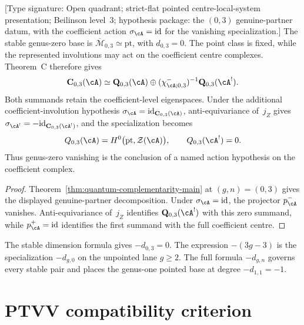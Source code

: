 \begin{proposition}
\label{prop:theorem-C-stable-genus-zero}
\textup{[Type signature: Open quadrant; strict-flat pointed
centre-local-system presentation; Beilinson level~\(3\); hypothesis
package: the \((0,3)\) genuine-partner datum, with the coefficient
action \(\sigma_\cA=\mathrm{id}\) for the vanishing specialization.]}
The stable genus-zero base is
\(\overline{\mathcal M}_{0,3}\simeq\mathrm{pt}\), with
\(d_{0,3}=0\).  The point class is fixed, while the represented
involutions may act on the coefficient centre complexes.  Theorem~C
therefore gives
\[
 \mathbf C_{0,3}(\cA)\simeq
 \mathbf Q_{0,3}(\cA)\oplus
 (\chi^-_{\cA;0,3})^{-1}\mathbf Q_{0,3}(\cA^!).
\]
Both summands retain the coefficient-level eigenspaces.  Under the
additional coefficient-involution hypothesis
\(\sigma_{\cA}=\mathrm{id}_{\mathbf C_{0,3}(\cA)}\),
anti-equivariance of~\(j_Z\) gives
\(\sigma_{\cA^!}=-\mathrm{id}_{\mathbf C_{0,3}(\cA^!)}\), and the
specialization becomes
\[
 Q_{0,3}(\cA)=H^0\bigl(\mathrm{pt},\mathcal Z(\cA)\bigr),
 \qquad Q_{0,3}(\cA^!)=0.
\]
Thus genus-zero vanishing is the conclusion of a named action
hypothesis on the coefficient complex.
\end{proposition}

\begin{proof}
Theorem~\ref{thm:quantum-complementarity-main} at \((g,n)=(0,3)\)
gives the displayed genuine-partner decomposition.  Under
\(\sigma_\cA=\mathrm{id}\), the projector \(p^-_\cA\) vanishes.
Anti-equivariance of~\(j_Z\) identifies
\(\mathbf Q_{0,3}(\cA^!)\) with this zero summand, while
\(p^+_\cA=\mathrm{id}\) identifies the first summand with the full
coefficient centre.
\end{proof}

\begin{remark}
\label{rem:plus-three-shift-nonissue}%
%
The stable dimension formula gives \(-d_{0,3}=0\).  The expression
\(-(3g-3)\) is the specialization \(-d_{g,0}\) on the unpointed
lane \(g\geq2\).  The full formula \(-d_{g,n}\) governs every stable
pair and places the genus-one pointed base at degree \(-d_{1,1}=-1\).
\end{remark}

\section{PTVV compatibility criterion}
\label{sec:C-PTVV-alternative}


